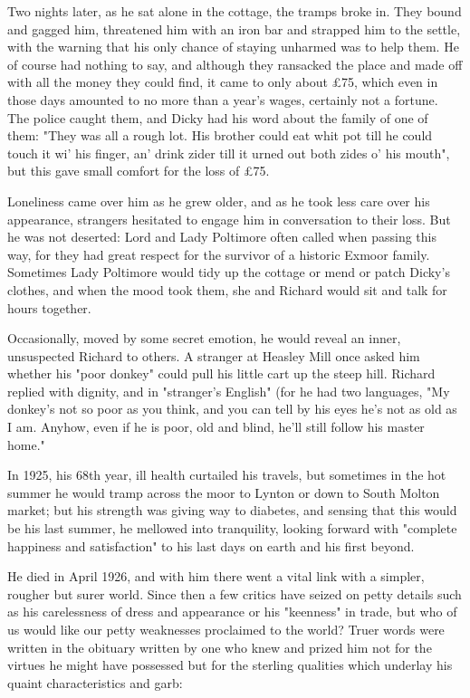 Two nights later, as he sat alone in the cottage, the tramps broke in. They bound and gagged him, threatened him with an iron bar and strapped him to the settle, with the warning that his only chance of staying unharmed was to help them. He of course had nothing to say, and although they ransacked the place and made off with all the money they could find, it came to only about £75, which even in those days amounted to no more than a year's wages, certainly not a fortune. The police caught them, and Dicky had his word about the family of one of them: "They was all a rough lot. His brother could eat whit pot till he could touch it wi' his finger, an' drink zider till it urned out both zides o' his mouth", but this gave small comfort for the loss of £75.

Loneliness came over him as he grew older, and as he took less care over his appearance, strangers hesitated to engage him in conversation   to their loss. But he was not deserted: Lord and Lady Poltimore often called when passing this way, for they had great respect for the survivor of a historic Exmoor family. Sometimes Lady Poltimore would tidy up the cottage or mend or patch Dicky's clothes, and when the mood took them, she and Richard would sit and talk for hours together.

Occasionally, moved by some secret emotion, he would reveal an inner, unsuspected Richard to others. A stranger at Heasley Mill once asked him whether his "poor donkey" could pull his little cart up the steep hill. Richard replied with dignity, and in "stranger's English" (for he had two languages, "My donkey's not so poor as you think, and you can tell by his eyes he's not as old as I am. Anyhow, even if he is poor, old and blind, he'll still follow his master home."

In 1925, his 68th year, ill health curtailed his travels, but sometimes in the hot summer he would tramp across the moor to Lynton or down to South Molton market; but his strength was giving way to diabetes, and sensing that this would be his last summer, he mellowed into tranquility, looking forward with "complete happiness and satisfaction" to his last days on earth and his first beyond.

He died in April 1926, and with him there went a vital link with a simpler, rougher but surer world. Since then a few critics have seized on petty details such as his carelessness of dress and appearance or his "keenness" in trade, but who of us would like our petty weaknesses proclaimed to the world? Truer words were written in the obituary written by one who knew and prized him not for the virtues he might have possessed but for the sterling qualities which underlay his quaint characteristics and garb:

